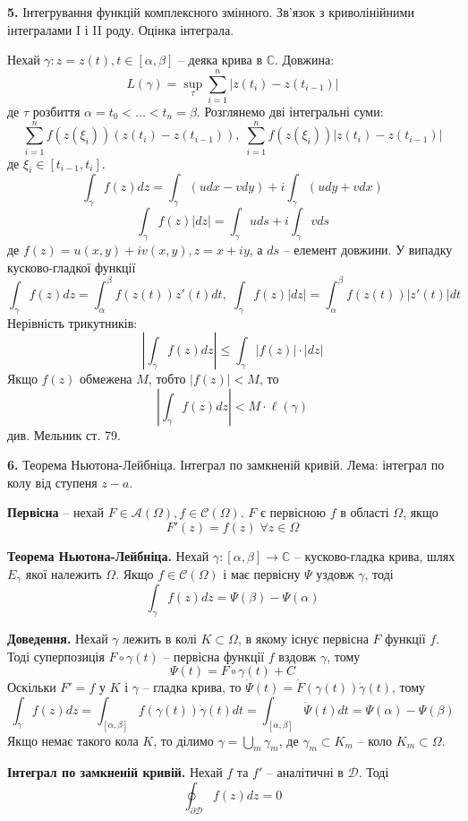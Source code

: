 \documentclass[14pt]{extarticle}
\begin{document}
\textbf{5.} Інтегрування функцій комплексного змінного. Зв'язок з криволінійними інтегралами I і II роду.
Оцінка інтеграла.

Нехай $\gamma: z=z(t),t \in [\alpha,\beta]$ -- деяка крива в $\mathbb{C}$. Довжина:
\[
L(\gamma) = \sup_{\tau} \sum_{i=1}^n |z(t_i)-z(t_{i-1})|
\]
де $\tau$ розбиття $\alpha=t_0<\dots<t_n=\beta$. Розглянемо дві інтегральні суми:
\[
\sum_{i=1}^n f(z(\xi_i))(z(t_i)-z(t_{i-1})), \; \sum_{i=1}^n f(z(\xi_i))|z(t_i)-z(t_{i-1})|
\]
де $\xi_i \in [t_{i-1},t_i]$. 
\[
\int_{\gamma} f(z)dz = \int_{\gamma}(udx-vdy)+i\int_{\gamma}(udy+vdx)
\]
\[
\int_{\gamma}f(z)|dz| = \int_{\gamma}uds + i\int_{\gamma}vds
\]
де $f(z)=u(x,y)+iv(x,y),z=x+iy$, а $ds$ -- елемент довжини. У випадку кусково-гладкої функції
\[
\int_{\gamma}f(z)dz = \int_{\alpha}^{\beta}f(z(t))z'(t)dt, \; \int_{\gamma}f(z)|dz| = \int_{\alpha}^{\beta}f(z(t))|z'(t)|dt
\]
Нерівність трикутників:
\[
\left|\int_{\gamma}f(z)dz\right| \leq \int_{\gamma}|f(z)|\cdot|dz|
\]
Якщо $f(z)$ обмежена $M$, тобто $|f(z)|<M$, то
\[
\left|\int_{\gamma}f(z)dz\right| < M\cdot \ell(\gamma)
\]
див. Мельник ст. 79.

\textbf{6.} Теорема Ньютона-Лейбніца. Інтеграл по замкненій кривій. Лема: інтеграл по колу від ступеня $z-a$.

\textbf{Первісна} -- нехай $F \in \mathcal{A}(\Omega), f \in \mathcal{C}(\Omega)$. $F$ є первісною $f$ в області $\Omega$, якщо
\[
F'(z) = f(z) \; \forall z \in \Omega
\]

\textbf{Теорема Ньютона-Лейбніца.} Нехай $\gamma: [\alpha,\beta] \to \mathbb{C}$ -- кусково-гладка крива, шлях $E_{\gamma}$ якої належить $\Omega$. Якщо $f \in \mathcal{C}(\Omega)$ і має первісну $\Psi$ уздовж $\gamma$, тоді
\[
\int_{\gamma}f(z)dz = \Psi(\beta)-\Psi(\alpha)
\]

\textbf{Доведення.} Нехай $\gamma$ лежить в колі $K \subset \Omega$, в якому існує первісна $F$ функції $f$. Тоді суперпозиція $F \circ \gamma(t)$ -- первісна функції $f$ вздовж $\gamma$, тому
\[
\Psi(t) = F \circ \gamma(t) + C
\]
Оскільки $F'=f$ у $K$ і $\gamma$ -- гладка крива, то $\dot{\Psi}(t)=\dot{F}(\gamma(t))\dot{\gamma}(t)$, тому
\[
\int_{\gamma}f(z)dz = \int_{[\alpha,\beta]}f(\gamma(t))\dot{\gamma}(t)dt=\int_{[\alpha,\beta]}\dot{\Psi}(t)dt = \Psi(\alpha)-\Psi(\beta)
\]
Якщо немає такого кола $K$, то ділимо $\gamma = \bigcup_{m}\gamma_m$, де $\gamma_m \subset K_m$ -- коло $K_m \subset \Omega$. 

\textbf{Інтеграл по замкненій кривій.} Нехай $f$ та $f'$ -- аналітичні в $\mathcal{D}$. Тоді
\[
\oint_{\partial\mathcal{D}}f(z)dz=0
\]
\end{document}
